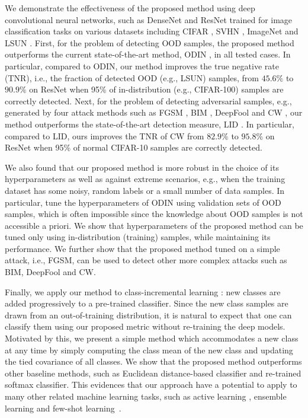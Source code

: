 \documentclass{article}
\begin{document}
We demonstrate the effectiveness of the proposed method using deep convolutional neural networks,
such as DenseNet \citep{huang2017densely} and ResNet \citep{he2016deep} trained for image classification tasks on various datasets including CIFAR \citep{krizhevsky2009learning}, SVHN \citep{netzer2011reading}, ImageNet \citep{deng2009imagenet} and LSUN \citep{yu2015lsun}.
First, for the problem of detecting OOD samples, the proposed method 
outperforms the current state-of-the-art method, ODIN \citep{liang2017principled}, 
in all tested cases.
In particular, compared to ODIN,
our method improves the true negative rate (TNR), i.e., the fraction of detected OOD (e.g., LSUN) samples,
from $45.6\%$ to $90.9\%$ on ResNet when 95\% of in-distribution (e.g., CIFAR-100) samples are correctly detected.
Next, for the problem of detecting adversarial samples, e.g., generated by four attack methods such as FGSM \citep{goodfellow2014explaining}, BIM \citep{kurakin2016adversarial}, DeepFool \citep{moosavi2016deepfool} and CW \citep{carlini2017adversarial},
our method outperforms the state-of-the-art detection measure, LID \citep{ma2018characterizing}.
In particular, compared to LID,
ours improves the TNR of CW from $82.9\%$ to $95.8\%$ on ResNet when 95\% of normal CIFAR-10 samples are correctly detected.

We also found that our proposed method is more robust in the choice of its hyperparameters as well as against extreme scenarios, e.g., when the training dataset has 
some noisy, random labels or a small number of data samples.
In particular, \citet{liang2017principled} tune the hyperparameters of ODIN using validation sets of OOD samples, which is often impossible since the knowledge about OOD samples is not accessible a priori.
We show that hyperparameters of
the proposed method can be tuned only using in-distribution (training) samples, while maintaining its performance. We further show that the proposed method tuned on a simple attack, i.e., FGSM, can be used to detect other more complex attacks such as BIM, DeepFool and CW.



Finally, we apply our method to class-incremental learning \citep{rebuffi2017icarl}: new classes are added progressively to a pre-trained classifier.
Since the new class samples are drawn from an out-of-training distribution,
it is natural to expect that one can classify them using our proposed metric without re-training the deep models.
Motivated by this,
we present a simple method which accommodates a new class at any time by simply computing the class mean of the new class and updating the tied covariance of all classes.
We show that the proposed method outperforms other baseline methods,
such as Euclidean distance-based classifier and re-trained softmax classifier.
This evidences that our approach have a potential to apply to many other related machine learning tasks, such as active learning \citep{gal2017deep}, ensemble learning \citep{lee2017confident} and few-shot learning~\citep{vinyals2016matching}.
\end{document}
